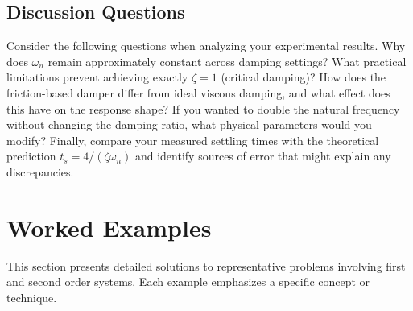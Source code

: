 \subsection{Discussion Questions}

Consider the following questions when analyzing your experimental results. Why does $\omega_n$ remain approximately constant across damping settings? What practical limitations prevent achieving exactly $\zeta = 1$ (critical damping)? How does the friction-based damper differ from ideal viscous damping, and what effect does this have on the response shape? If you wanted to double the natural frequency without changing the damping ratio, what physical parameters would you modify? Finally, compare your measured settling times with the theoretical prediction $t_s = 4/(\zeta\omega_n)$ and identify sources of error that might explain any discrepancies.

\section{Worked Examples}

This section presents detailed solutions to representative problems involving first and second order systems. Each example emphasizes a specific concept or technique.

